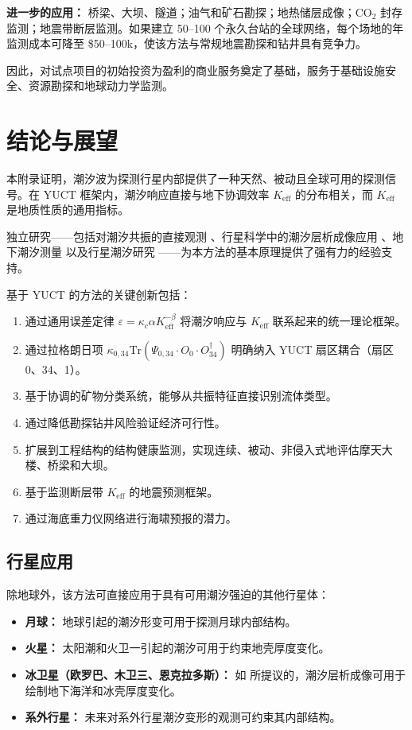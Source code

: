 \documentclass[12pt,a4paper]{article}
\theoremstyle{remark}
\newcommand{\Keff}{K_{\mathrm{eff}}}
\newcommand{\kappac}{\kappa_c}
\newcommand{\eps}{\varepsilon}
\begin{document}
	\textbf{进一步的应用：} 桥梁、大坝、隧道；油气和矿石勘探；地热储层成像；CO$_2$ 封存监测；地震带断层监测。如果建立 50–100 个永久台站的全球网络，每个场地的年监测成本可降至 \$50–100k，使该方法与常规地震勘探和钻井具有竞争力。
	
	因此，对试点项目的初始投资为盈利的商业服务奠定了基础，服务于基础设施安全、资源勘探和地球动力学监测。
	
	\section{结论与展望}
	\label{sec:conclusion}
	
	本附录证明，潮汐波为探测行星内部提供了一种天然、被动且全球可用的探测信号。在 YUCT 框架内，潮汐响应直接与地下协调效率 $\Keff$ 的分布相关，而 $\Keff$ 是地质性质的通用指标。
	
	独立研究——包括对潮汐共振的直接观测 \cite{Sibgatulin2014}、行星科学中的潮汐层析成像应用 \cite{RoviraNavarro2025}、地下潮汐测量 \cite{Rogister2024} 以及行星潮汐研究 \cite{Briaud2025}——为本方法的基本原理提供了强有力的经验支持。
	
	基于 YUCT 的方法的关键创新包括：
	
	\begin{enumerate}
		\item 通过通用误差定律 $\eps = \kappac \alpha \Keff^{-\beta}$ 将潮汐响应与 $\Keff$ 联系起来的统一理论框架。
		\item 通过拉格朗日项 $\kappa_{0,34} \mathrm{Tr}(\Psi_{0,34} \cdot O_0 \cdot O_{34}^\dagger)$ 明确纳入 YUCT 扇区耦合（扇区 0、34、1）。
		\item 基于协调的矿物分类系统，能够从共振特征直接识别流体类型。
		\item 通过降低勘探钻井风险验证经济可行性。
		\item 扩展到工程结构的结构健康监测，实现连续、被动、非侵入式地评估摩天大楼、桥梁和大坝。
		\item 基于监测断层带 \(K_{\mathrm{eff}}\) 的地震预测框架。
		\item 通过海底重力仪网络进行海啸预报的潜力。
	\end{enumerate}
	
	\subsection{行星应用}
	
	除地球外，该方法可直接应用于具有可用潮汐强迫的其他行星体：
	
	\begin{itemize}
		\item \textbf{月球：} 地球引起的潮汐形变可用于探测月球内部结构。
		\item \textbf{火星：} 太阳潮和火卫一引起的潮汐可用于约束地壳厚度变化。
		\item \textbf{冰卫星（欧罗巴、木卫三、恩克拉多斯）：} 如 \cite{RoviraNavarro2025} 所提议的，潮汐层析成像可用于绘制地下海洋和冰壳厚度变化。
		\item \textbf{系外行星：} 未来对系外行星潮汐变形的观测可约束其内部结构。
	\end{itemize}
	
\end{document}
